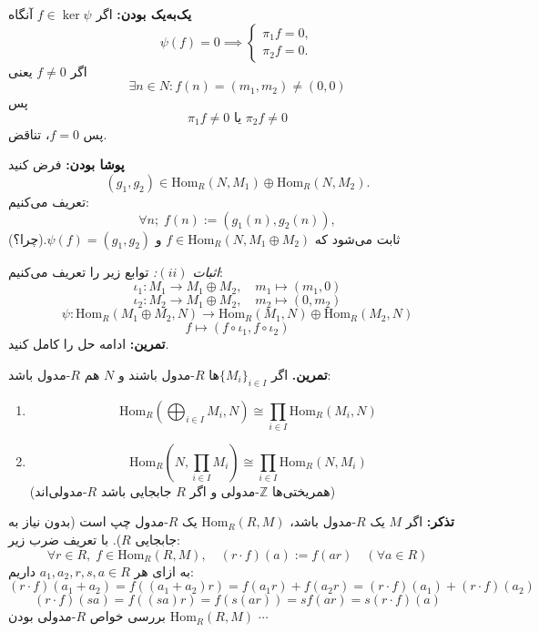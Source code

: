 \textbf{یک‌به‌یک بودن:}
اگر \( f \in \ker \psi \) آنگاه
\[
    \psi(f) = 0 \implies
    \begin{cases}
        \pi_1 f = 0, \\
        \pi_2 f = 0.
    \end{cases}
\]
اگر \( f \neq 0 \) یعنی
\[
    \exists n \in N : f(n) = (m_1,m_2) \neq (0,0)
\] پس
\[
    \pi_1 f \neq 0\text{ یا }\pi_2 f \neq 0
\]
پس \( f=0 \)،
تناقض.

\textbf{پوشا بودن:}
فرض کنید
\[
    (g_1, g_2) \in \mathrm{Hom}_R(N,M_1) \oplus \mathrm{Hom}_R(N,M_2).
\]
تعریف می‌کنیم:
\[
    \forall n; \;f(n) := (g_1(n), g_2(n)),
\]
ثابت می‌شود که
\( f \in \mathrm{Hom}_R(N, M_1 \oplus M_2)\)
و
\(\psi(f) = (g_1,g_2)\).(چرا؟)

\hrulefill

\textit{اثبات \((ii)\):}
توابع زیر را تعریف می‌کنیم:
\[
    \iota_1 : M_1 \to M_1 \oplus M_2, \quad m_1 \mapsto (m_1, 0)
\]
\[
    \iota_2 : M_2 \to M_1 \oplus M_2, \quad m_2 \mapsto (0, m_2)
\]
\[
    \psi : \mathrm{Hom}_R(M_1 \oplus M_2, N) \to \mathrm{Hom}_R(M_1,N) \oplus \mathrm{Hom}_R(M_2,N)
\]
\[
    f \mapsto (f \circ \iota_1, f \circ \iota_2)
\]
\textbf{تمرین:}
ادامه حل را کامل کنید.


\hrulefill

\textbf{تمرین.} اگر \( \{M_i\}_{i\in I} \)ها \( R \)-مدول باشند و \( N \) هم \( R \)-مدول باشد:
\begin{enumerate}
    \item
          \[
              \mathrm{Hom}_R\left( \bigoplus_{i \in I} M_i, N \right) \cong \prod_{i \in I} \mathrm{Hom}_R(M_i, N)
          \]
    \item
          \[
              \mathrm{Hom}_R\left( N, \prod_{i \in I} M_i \right) \cong \prod_{i \in I} \mathrm{Hom}_R(N, M_i)
          \]
          (همریختی‌ها \(\mathbb{Z}\)-مدولی و اگر \( R \) جابجایی باشد \( R \)-مدولی‌اند)
\end{enumerate}

\hrulefill

\textbf{تذکر:} اگر \( M \) یک \( R \)-مدول باشد، \(\mathrm{Hom}_R(R,M)\) یک \( R \)-مدول چپ است (بدون نیاز به جابجایی \( R \)).
با تعریف ضرب زیر:
\[
    \forall r \in R, \; f \in \mathrm{Hom}_R(R,M), \quad (r \cdot f)(a) := f(ar) \quad (\forall a \in R)
\]
به ازای هر
\(a_1, a_2, r, s, a \in R\)
داریم:
\[
    (r \cdot f)(a_1+a_2) = f((a_1+a_2)r) = f(a_1r) + f(a_2r) = (r \cdot f)(a_1) + (r \cdot f)(a_2)
\]
\[
    (r \cdot f)(sa) = f((sa)r) = f(s(ar)) = s f(ar) = s (r \cdot f)(a)
\]
بررسی خواص
\(R\)-مدولی
بودن
\(\mathrm{Hom}_R(R,M) \) \(\cdots\)


